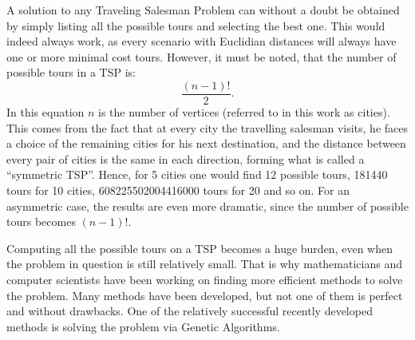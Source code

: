A solution to any Traveling Salesman Problem can without a doubt be obtained by simply listing all the possible tours and selecting the best one. This would indeed always work, as every scenario with Euclidian distances will always have one or more minimal cost tours. However, it must be noted, that the number of possible tours in a TSP is: \[\frac{(n-1)!}{2}.\] \noindent In this equation $n$ is the number of vertices (referred to in this work as cities). This comes from the fact that at every city the travelling salesman visits, he faces a choice of the remaining cities for his next destination, and the distance between every pair of cities is the same in each direction, forming what is called a “symmetric TSP”. Hence, for 5 cities one would find 12 possible tours, 181440 tours for 10 cities, 608225502004416000 tours for 20 and so on. For an asymmetric case, the results are even more dramatic, since the number of possible tours becomes $(n-1)!$.

Computing all the possible tours on a TSP becomes a huge burden, even when the problem in question is still relatively small. That is why mathematicians and computer scientists have been working on finding more efficient methods to solve the problem. Many methods have been developed, but not one of them is perfect and without drawbacks. One of the relatively successful recently developed methods is solving the problem via Genetic Algorithms.